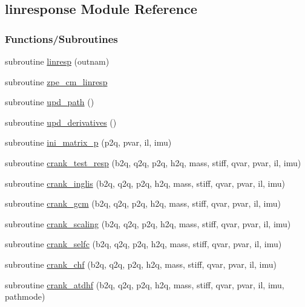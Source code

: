 \hypertarget{namespacelinresponse}{}\subsection{linresponse Module Reference}
\label{namespacelinresponse}
\subsubsection*{Functions/\+Subroutines}
\begin{DoxyCompactItemize}
\item 
subroutine \hyperlink{namespacelinresponse_ac7dc729b94ff97324cbcb373a7053824}{linresp} (outnam)
\item 
subroutine \hyperlink{namespacelinresponse_aab3668ccec9e4ea33e562dab64df6ea7}{zpe\+\_\+cm\+\_\+linresp}
\item 
subroutine \hyperlink{namespacelinresponse_accf4858777e66315385254729a6171a9}{upd\+\_\+path} ()
\item 
subroutine \hyperlink{namespacelinresponse_a50077a49a59d82124945f738cc437277}{upd\+\_\+derivatives} ()
\item 
subroutine \hyperlink{namespacelinresponse_ab65d39013d00e2cd1de48c1b00346e75}{ini\+\_\+matrix\+\_\+p} (p2q, pvar, il, imu)
\item 
subroutine \hyperlink{namespacelinresponse_a95312b973b472d59dc5295754cc55d9a}{crank\+\_\+test\+\_\+resp} (b2q, q2q, p2q, h2q, mass, stiff, qvar, pvar, il, imu)
\item 
subroutine \hyperlink{namespacelinresponse_a777faa79d49267e9d5ace6baa9b61b23}{crank\+\_\+inglis} (b2q, q2q, p2q, h2q, mass, stiff, qvar, pvar, il, imu)
\item 
subroutine \hyperlink{namespacelinresponse_a9f43d9ba17b599e367e32c1a116cf9ee}{crank\+\_\+gcm} (b2q, q2q, p2q, h2q, mass, stiff, qvar, pvar, il, imu)
\item 
subroutine \hyperlink{namespacelinresponse_ab848da5b377f9ae7a08bafb5dd17639e}{crank\+\_\+scaling} (b2q, q2q, p2q, h2q, mass, stiff, qvar, pvar, il, imu)
\item 
subroutine \hyperlink{namespacelinresponse_a036dc4cb7a96c3c1e325f114354d0b45}{crank\+\_\+selfc} (b2q, q2q, p2q, h2q, mass, stiff, qvar, pvar, il, imu)
\item 
subroutine \hyperlink{namespacelinresponse_ad6ff2cb4832bf0daf8777d1f4018fd23}{crank\+\_\+chf} (b2q, q2q, p2q, h2q, mass, stiff, qvar, pvar, il, imu)
\item 
subroutine \hyperlink{namespacelinresponse_a617bf806d780675484099cc4305c0d6c}{crank\+\_\+atdhf} (b2q, q2q, p2q, h2q, mass, stiff, qvar, pvar, il, imu, pathmode)

\end{DoxyCompactItemize}
